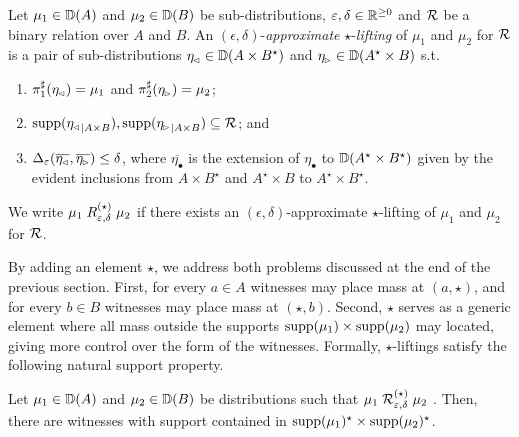 \documentclass{lmcs}
\begin{document}
\begin{defi}
  Let $\mu_1 \in {\mathbb{D}}(A)$ and $\mu_2 \in {\mathbb{D}}(B)$ be sub-distributions,
  $\varepsilon, \delta \in \mathbb{R}^{\geq 0}$ and $\mathrel{\mathcal{R}}$ be a binary relation over $A$
  and $B$. An $(\epsilon, \delta)$-\emph{approximate} $\star$-\emph{lifting} of
  $\mu_1$ and $\mu_2$ for $\mathrel{\mathcal{R}}$ is a pair of sub-distributions
  $\eta_{\mspace{-1.5mu}{\scriptscriptstyle \vartriangleleft}} \in {\mathbb{D}}(A \times B^\star)$ and
  $\eta_{\mspace{-1.5mu}{\scriptscriptstyle \vartriangleright}} \in {\mathbb{D}}(A^\star \times B)$ s.t.
  \begin{enumerate}
  \item $\pi_{1}^{\sharp}(\eta_{\mspace{-1.5mu}{\scriptscriptstyle \vartriangleleft}}) = \mu_1$ and $\pi_{2}^{\sharp}(\eta_{\mspace{-1.5mu}{\scriptscriptstyle \vartriangleright}}) = \mu_2$;
  \item
    $\operatorname{supp}({\eta_{\mspace{-1.5mu}{\scriptscriptstyle \vartriangleleft}}}_{|A \times B}) ,
     \operatorname{supp}({\eta_{\mspace{-1.5mu}{\scriptscriptstyle \vartriangleright}}}_{|A \times B}) \subseteq \mathcal{R}$; and
  \item $\Delta_{\varepsilon}(
           \overline{\eta_{\mspace{-1.5mu}{\scriptscriptstyle \vartriangleleft}}},
           \overline{\eta_{\mspace{-1.5mu}{\scriptscriptstyle \vartriangleright}}}) \leq \delta$,
  where $\overline{\eta_{\bullet}}$ is the extension of
  $\eta_{\bullet}$ to ${\mathbb{D}}(A^\star \times B^\star)$ given by the evident
  inclusions from $A \times B^\star$ and $A^\star \times B$ to $A^\star \times
  B^\star$.
  \end{enumerate}
  We write
  $\mu_1 \mathrel{R^{(\star)}_{\varepsilon, \delta}} \mu_2$
  if there exists an $(\epsilon, \delta)$-approximate $\star$-lifting of
  $\mu_1$ and $\mu_2$ for $\mathrel{\mathcal{R}}$.
\end{defi}

By adding an element $\star$, we address both problems discussed at
the end of the previous section. First, for every $a \in A$ witnesses may
place mass at $(a, \star)$, and for every $b \in B$ witnesses may place
mass at $(\star, b)$. Second, $\star$ serves as a generic element
where all mass outside the supports $\operatorname{supp}(\mu_1) \times
\operatorname{supp}(\mu_2)$ may located, giving more control over the form of the witnesses.
Formally, $\star$-liftings satisfy the following natural support property.

\begin{lem} \label{l:alift:supp}
  Let $\mu_1 \in {\mathbb{D}}(A)$ and $\mu_2 \in {\mathbb{D}}(B)$ be distributions such that
  $ \mu_1 \mathrel{\mathrel{\mathcal{R}}^{(\star)}_{\varepsilon, \delta}} \mu_2$ .
  Then, there are witnesses with support contained in $\operatorname{supp}(\mu_1)^\star \times
  \operatorname{supp}(\mu_2)^\star$.
\end{lem}
\end{document}

